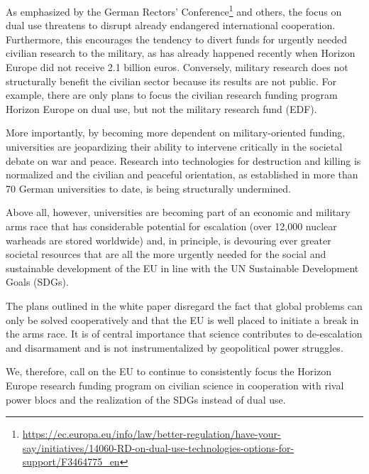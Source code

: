 \documentclass[DIV=calc]{scrartcl}
\begin{document}
As emphasized by the German Rectors' Conference\footnote{\url{https://ec.europa.eu/info/law/better-regulation/have-your-say/initiatives/14060-RD-on-dual-use-technologies-options-for-support/F3464775_en}} and others, the focus on dual use threatens to disrupt already endangered international cooperation. Furthermore, this encourages the tendency to divert funds for urgently needed civilian research to the military, as has already happened recently when Horizon Europe did not receive 2.1 billion euros.
Conversely, military research does not structurally benefit the civilian sector because its results are not public. For example, there are only plans to focus the civilian research funding program Horizon Europe on dual use, but not the military research fund (EDF).

More importantly, by becoming more dependent on military-oriented funding, universities are jeopardizing their ability to intervene critically in the societal debate on war and peace. Research into technologies for destruction and killing is normalized and the civilian and peaceful orientation, as established in more than 70 German universities to date, is being structurally undermined.

Above all, however, universities are becoming part of an economic and military arms race that has considerable potential for escalation (over 12,000 nuclear warheads are stored worldwide) and, in principle, is devouring ever greater  societal resources that are all the more urgently needed for the social and sustainable development of the EU in line with the UN Sustainable Development Goals (SDGs).

The plans outlined in the white paper disregard the fact that global problems can only be solved cooperatively and that the EU is well placed to initiate a break in the arms race. It is of central importance that science contributes to de-escalation and disarmament and is not instrumentalized by geopolitical power struggles.

We, therefore, call on the EU to continue to consistently focus the Horizon Europe research funding program on civilian science in cooperation with rival power blocs and the realization of the SDGs instead of dual use.
\end{document}
